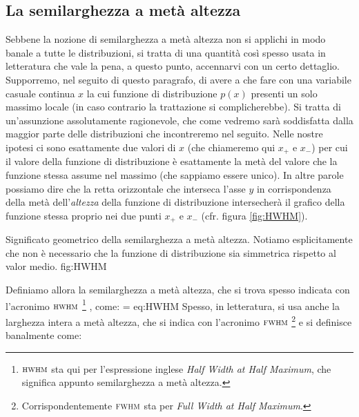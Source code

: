 \subsection{\label{subsec:HWHM}La semilarghezza a met\`a altezza}
Sebbene la nozione di semilarghezza a met\`a altezza non si applichi 
in modo banale a tutte le distribuzioni, si tratta di una quantit\`a cos\`i
spesso usata in letteratura che vale la pena, a questo punto, accennarvi
con un certo dettaglio.
Supporremo, nel seguito di questo paragrafo, di avere a che fare con una
variabile casuale continua $x$ la cui funzione di distribuzione $p(x)$
presenti un solo massimo locale (in caso contrario la trattazione si
complicherebbe).
Si tratta di un'assunzione assolutamente ragionevole, che come vedremo
sar\`a soddisfatta dalla maggior parte delle distribuzioni che incontreremo nel
seguito.
Nelle nostre ipotesi ci sono esattamente due valori di $x$ (che chiameremo
qui $x_+$ e $x_-$) per cui il valore della funzione di distribuzione \`e
esattamente la met\`a del valore che la funzione stessa assume nel massimo
(che sappiamo essere unico).
In altre parole possiamo dire che la retta orizzontale che interseca l'asse $y$
in corrispondenza della met\`a dell'\emph{altezza} della funzione di
distribuzione intersecher\`a il grafico della funzione stessa proprio nei due
punti $x_+$ e $x_-$ (cfr. figura \ref{fig:HWHM}).

\panelfig
{}
{Significato geometrico della semilarghezza a met\`a altezza.
Notiamo esplicitamente che non \`e necessario che la funzione di distribuzione
sia simmetrica rispetto al valor medio.}
{fig:HWHM}

\noindent Definiamo allora la semilarghezza a met\`a altezza, che si trova
spesso indicata con l'acronimo ${\scriptstyle \textsc{HWHM}}$%
\footnote{
${\scriptstyle \textsc{HWHM}}$ sta qui per l'espressione inglese \emph{Half Width at Half Maximum},
che significa appunto semilarghezza a met\`a altezza. 
}%
, come:
\eqnlbox
{\hwhm = }
{eq:HWHM}
Spesso, in letteratura, si usa anche la larghezza intera a met\`a altezza,
che si indica con l'acronimo ${\scriptstyle \textsc{FWHM}}$%
\footnote{
Corrispondentemente ${\scriptstyle \textsc{FWHM}}$ sta per \emph{Full Width at Half Maximum}.
}
e si definisce banalmente come:

\begin{exemplify}


\end{exemplify}

